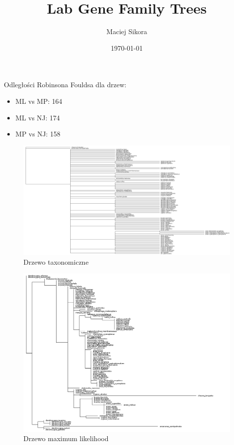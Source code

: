 \documentclass[12pt]{article}
\title{Lab Gene Family Trees}
\author{Maciej Sikora}
\date{\specialdate\today}
\begin{document}
\maketitle
Odległości Robinsona Fouldsa dla drzew:
\begin{itemize}
\item ML vs MP: 164
\item ML vs NJ: 174
\item MP vs NJ: 158
\end{itemize}

\begin{figure}[H]
\begin{center}
\includegraphics[width=\textwidth]{taxonomy}
\caption{Drzewo taxonomiczne}
\end{center}
\end{figure}

\begin{figure}[H]
\begin{center}
\includegraphics[width=\textwidth]{ml}
\caption{Drzewo maximum likelihood}
\end{center}
\end{figure}
\end{document}
